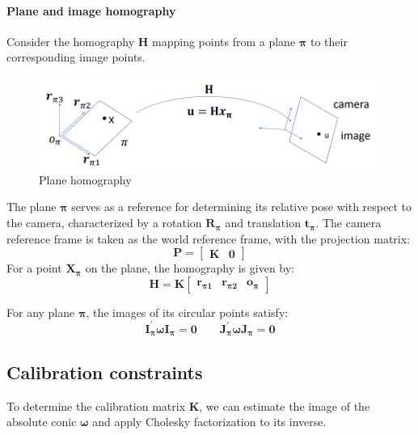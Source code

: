 \paragraph*{Plane and image homography}
Consider the homography $\mathbf{H}$ mapping points from a plane $\boldsymbol{\pi}$ to their corresponding image points.
\begin{figure}[H]
    \centering
    \includegraphics[width=0.75\linewidth]{images/plh.png}
    \caption{Plane homography}
\end{figure}
The plane $\boldsymbol{\pi}$ serves as a reference for determining its relative pose with respect to the camera, characterized by a rotation $\mathbf{R}_{\boldsymbol{\pi}}$ and translation $\mathbf{t}_{\boldsymbol{\pi}}$. 
The camera reference frame is taken as the world reference frame, with the projection matrix:
\[\mathbf{P}=\begin{bmatrix} \mathbf{K} & \mathbf{0} \end{bmatrix}\]
For a point $\mathbf{X}_{\boldsymbol{\pi}}$ on the plane, the homography is given by:
\[\mathbf{H}=\mathbf{K}\begin{bmatrix} \mathbf{r}_{\boldsymbol{\pi}\mathbf{1}} & \mathbf{r}_{\boldsymbol{\pi}\mathbf{2}} & \mathbf{o}_{\boldsymbol{\pi}} \end{bmatrix}\]
\begin{property}
    For any plane $\boldsymbol{\pi}$, the images of its circular points satisfy: 
    \[\mathbf{I}^\prime_{\boldsymbol{\pi}}\boldsymbol{\omega}\mathbf{I}_{\boldsymbol{\pi}}=\mathbf{0}\qquad\mathbf{J}^\prime_{\boldsymbol{\pi}}\boldsymbol{\omega}\mathbf{J}_{\boldsymbol{\pi}}=\mathbf{0}\]
\end{property}

\subsection{Calibration constraints}
To determine the calibration matrix $\mathbf{K}$, we can estimate the image of the absolute conic $\boldsymbol{\omega}$ and apply Cholesky factorization to its inverse.

